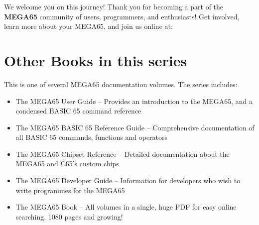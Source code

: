 We welcome you on this journey! Thank you for becoming a part of the {\bf MEGA65} community of users, programmers, and enthusiasts! Get involved, learn more about your MEGA65, and join us online at:


\section{Other Books in this series}

This is one of several MEGA65 documentation volumes. The series includes:

\begin{itemize}
	\item The MEGA65 User Guide -- Provides an introduction to the MEGA65, and a condensed BASIC 65 command reference
	\item The MEGA65 BASIC 65 Reference Guide -- Comprehensive documentation of all BASIC 65 commands, functions and operators
	\item The MEGA65 Chipset Reference -- Detailed documentation about the MEGA65 and C65's custom chips
	\item The MEGA65 Developer Guide -- Information for developers who wish to write programmes for the MEGA65
	\item The MEGA65 Book -- All volumes in a single, huge PDF for easy online searching. 1080 pages and growing!
\end{itemize}
